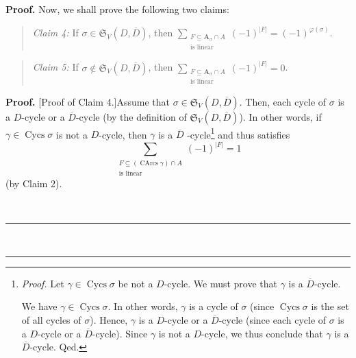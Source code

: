 \documentclass[numbers=enddot,12pt,final,onecolumn,notitlepage]{scrartcl}%
\numberwithin{exer}{section}
\theoremstyle{definition}
\newenvironment{statement}{\begin{quote}}{\end{quote}}
\newenvironment{proof}[1][Proof]{\noindent\textbf{#1.} }{\ \rule{0.5em}{0.5em}}
\let\sumnonlimits\sum
\renewcommand{\sum}{\sumnonlimits\limits}
\newenvironment{verlong}{}{}
\begin{document}
\begin{verlong}
\begin{proof}
Now, we shall prove the following two claims:

\begin{statement}
\textit{Claim 4:} If $\sigma\in\mathfrak{S}_{V}\left(  D,\overline{D}\right)
$, then $\sum_{\substack{F\subseteq\mathbf{A}_{\sigma}\cap A\\\text{is
linear}}}\left(  -1\right)  ^{\left\vert F\right\vert }=\left(  -1\right)
^{\varphi\left(  \sigma\right)  }$.
\end{statement}

\begin{statement}
\textit{Claim 5:} If $\sigma\notin\mathfrak{S}_{V}\left(  D,\overline
{D}\right)  $, then $\sum_{\substack{F\subseteq\mathbf{A}_{\sigma}\cap
A\\\text{is linear}}}\left(  -1\right)  ^{\left\vert F\right\vert }=0$.
\end{statement}

\begin{proof}
[Proof of Claim 4.]Assume that $\sigma\in\mathfrak{S}_{V}\left(
D,\overline{D}\right)  $. Then, each cycle of $\sigma$ is a $D$-cycle or a
$\overline{D}$-cycle (by the definition of $\mathfrak{S}_{V}\left(
D,\overline{D}\right)  $). In other words, if $\gamma\in\operatorname*{Cycs}%
\sigma$ is not a $D$-cycle, then $\gamma$ is a $\overline{D}$%
-cycle\footnote{\textit{Proof.} Let $\gamma\in\operatorname*{Cycs}\sigma$ be
not a $D$-cycle. We must prove that $\gamma$ is a $\overline{D}$-cycle.
\par
We have $\gamma\in\operatorname*{Cycs}\sigma$. In other words, $\gamma$ is a
cycle of $\sigma$ (since $\operatorname*{Cycs}\sigma$ is the set of all cycles
of $\sigma$). Hence, $\gamma$ is a $D$-cycle or a $\overline{D}$-cycle (since
each cycle of $\sigma$ is a $D$-cycle or a $\overline{D}$-cycle). Since
$\gamma$ is not a $D$-cycle, we thus conclude that $\gamma$ is a $\overline
{D}$-cycle. Qed.} and thus satisfies
\begin{equation}
\sum_{\substack{F\subseteq\left(  \operatorname*{CArcs}\gamma\right)  \cap
A\\\text{is linear}}}\left(  -1\right)  ^{\left\vert F\right\vert }=1
\label{pf.prop.linear-in-AsigA.long.c4.pf.1}%
\end{equation}
(by Claim 2).


\end{proof}
\end{proof}
\end{verlong}
\end{document}
